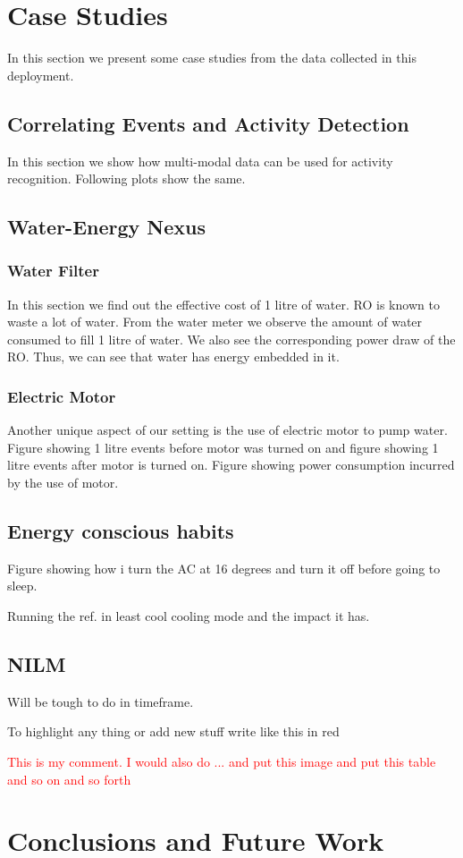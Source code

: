 \documentclass[10pt]{sensys-proc}
\newcommand{\redcolor}[1]{\textcolor{red}{#1}}
\begin{document}
\section{Case Studies}
In this section we present some case studies from the data collected in this deployment.
\subsection{Correlating Events and Activity Detection}
In this section we show how multi-modal data can be used for activity recognition. Following plots show the same.


\subsection{Water-Energy Nexus}
\subsubsection{Water Filter}
In this section we find out the effective cost of 1 litre of water. RO is known to waste a lot of water. From the water meter we observe the amount of water consumed to fill 1 litre of water. We also see the corresponding power draw of the RO. Thus, we can see that water has energy embedded in it.

\subsubsection{Electric Motor}
Another unique aspect of our setting is the use of electric motor to pump water. Figure showing 1 litre events before motor was turned on and figure showing 1 litre events after motor is turned on.
Figure showing power consumption incurred by the use of motor.

\subsection{Energy conscious habits}
Figure showing how i turn the AC at 16 degrees and turn it off before going to sleep.

Running the ref. in least cool cooling mode and the impact it has.

\subsection{NILM}
Will be tough to do in timeframe.

To highlight any thing or add new stuff write like this in red

\redcolor{This is my comment. I would also do ... and put this image and put this table and so on and so forth}

\section{Conclusions and Future Work}


\balance

\end{document}
